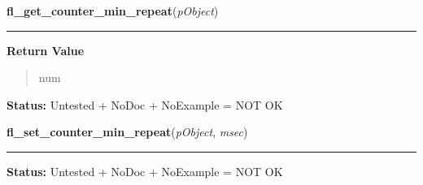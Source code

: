     \label{xformslib:library:fl_get_counter_min_repeat}

    \vspace{0.5ex}

\hspace{.8\funcindent}\begin{boxedminipage}{\funcwidth}

    \raggedright \textbf{fl\_get\_counter\_min\_repeat}(\textit{pObject})

    \vspace{-1.5ex}

    \rule{\textwidth}{0.5\fboxrule}
\setlength{\parskip}{2ex}
\setlength{\parskip}{1ex}
      \textbf{Return Value}
    \vspace{-1ex}

      \begin{quote}
      num

      \end{quote}

\textbf{Status:} Untested + NoDoc + NoExample = NOT OK



    \end{boxedminipage}

    \label{xformslib:library:fl_set_counter_min_repeat}

    \vspace{0.5ex}

\hspace{.8\funcindent}\begin{boxedminipage}{\funcwidth}

    \raggedright \textbf{fl\_set\_counter\_min\_repeat}(\textit{pObject}, \textit{msec})

    \vspace{-1.5ex}

    \rule{\textwidth}{0.5\fboxrule}
\setlength{\parskip}{2ex}
\setlength{\parskip}{1ex}
\textbf{Status:} Untested + NoDoc + NoExample = NOT OK



    \end{boxedminipage}

    \label{xformslib:library:fl_get_counter_speedjump}

